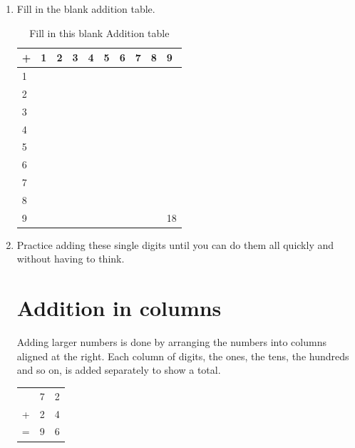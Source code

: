 \documentclass{article}
\begin{document}
\begin{enumerate}
\item Fill in the blank addition table.

\begin{table}[h]
\centering
\begin{tabular}{|l|l|l|l|l|l|l|l|l|l|}
\hline
+ & 1  & 2  & 3  & 4  & 5  & 6  & 7  & 8  & 9                       \\ \hline
1 &    &    &    &    &    &    &    &    &                         \\ \hline
2 &    &    &    &    &    &    &    &    &                         \\ \hline
3 &    &    &    &    &    &    &    &    &                         \\ \hline
4 &    &    &    &    &    &    &    &    &                         \\ \hline
5 &    &    &    &    &    &    &    &    &                         \\ \hline
6 &    &    &    &    &    &    &    &    &                         \\ \hline
7 &    &    &    &    &    &    &    &    &                         \\ \hline
8 &    &    &    &    &    &    &    &    &                         \\ \hline
9 &    &    &    &    &    &    &    &    & \multicolumn{1}{c|}{18} \\ \hline
\end{tabular}
\caption*{Fill in this blank Addition table}
\end{table}
\item Practice adding these single digits until you can do them all quickly and without having to think.

\newpage

\section*{Addition in columns}
Adding larger numbers is done by arranging the numbers into columns aligned at the right. Each column of digits, the ones, the tens, the hundreds and so on, is added separately to show a total.

\begin{center}
\begin{tabular}{c@{\,}c@{\,}c@{\,}}
 &7&2\\
+&2&4\\
\hline
=&9&6\\
\hline
\hline
\end{tabular}
\end{center}


\end{enumerate}
\end{document}
